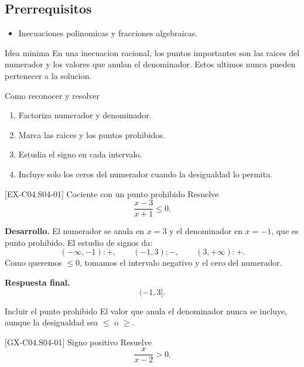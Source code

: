 \subsection*{Prerrequisitos}
\begin{itemize}
  \item Inecuaciones polinomicas y fracciones algebraicas.
\end{itemize}

\begin{theorybox}{Idea minima}
En una inecuacion racional, los puntos importantes son las raices del numerador y los valores
que anulan el denominador. Estos ultimos nunca pueden pertenecer a la solucion.
\end{theorybox}

\begin{methodbox}{Como reconocer y resolver}
\begin{enumerate}
  \item Factoriza numerador y denominador.
  \item Marca las raices y los puntos prohibidos.
  \item Estudia el signo en cada intervalo.
  \item Incluye solo los ceros del numerador cuando la desigualdad lo permita.
\end{enumerate}
\end{methodbox}

\begin{solvedexample}{[EX-C04.S04-01] Cociente con un punto prohibido}
Resuelve
\[
\frac{x-3}{x+1}\leq 0.
\]

\textbf{Desarrollo.} El numerador se anula en \(x=3\) y el denominador en \(x=-1\), que es
punto prohibido. El estudio de signos da:
\[
(-\infty,-1): +,\qquad (-1,3): -,\qquad (3,+\infty): +.
\]
Como queremos \(\leq 0\), tomamos el intervalo negativo y el cero del numerador.

\textbf{Respuesta final.}
\[
(-1,3].
\]
\end{solvedexample}

\begin{commonerror}{Incluir el punto prohibido}
El valor que anula el denominador nunca se incluye, aunque la desigualdad sea \(\leq\) o \(\geq\).
\end{commonerror}

\begin{guidedexercise}{[GX-C04.S04-01] Signo positivo}
Resuelve
\[
\frac{x}{x-2}>0.
\]
\end{guidedexercise}

